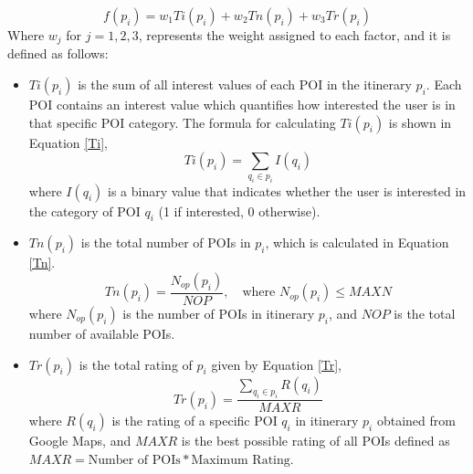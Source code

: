 \begin{equation}
	\label{agamFitness}
	f(p_i) = w_{1}Ti(p_i) + w_{2}Tn(p_i) + w_{3}Tr(p_i) 
\end{equation}
Where $w _{j}$ for $j = 1, 2, 3$, represents the weight assigned to each factor, and it is defined as follows:
\begin{itemize}
    
    \item $Ti(p_i)$ is the sum of all interest values of each POI in the itinerary $p_i$. Each POI contains an interest value which quantifies how interested the user is in that specific POI category. The formula for calculating $Ti(p_i)$ is shown in Equation \ref{Ti},
    \begin{equation}
		\label{Ti}
		Ti ( p _{i} ) = \sum _{q_i \in p_i} I(q_i)
	\end{equation}
	where $I(q_i)$ is a binary value that indicates whether the user is interested in the category of POI $q_i$ (1 if interested, 0 otherwise).
    
    \item $Tn (p _{i})$ is the total number of POIs in $p _{i}$, which is calculated in Equation \ref{Tn}.
    \begin{equation}
        \label{Tn}
        Tn ( p _{i}) = \frac{N _{op} ( p _{i} )}{NOP}, \quad \text{where } N _{op} ( p _{i} ) \le MAXN 
    \end{equation}
    where $N _{op} ( p _{i} )$ is the number of POIs in itinerary $p _{i}$, and $NOP$ is the total number of available POIs.
    
    \item $Tr( p _{i} )$ is the total rating of $p_i$ given by Equation \ref{Tr},
    \begin{equation}
        \label{Tr}
        Tr ( p _{i} ) = \frac{\sum_{q_i \in p_i} R(q_i)}{MAXR}
    \end{equation} 
    where $R(q_i)$ is the rating of a specific POI $q_i$ in itinerary $p_i$ obtained from Google Maps, and $MAXR$ is the best possible rating of all POIs defined as $MAXR = \text{Number of POIs} * \text{Maximum Rating}$.
\end{itemize}

